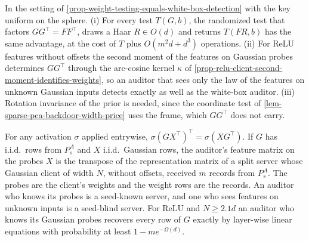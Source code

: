 \begin{proposition}
In the setting of \cref{prop-weight-testing-equals-white-box-detection} with the key
uniform on the sphere. (i) For every test $T(G,b)$, the randomized test that factors
$GG^\top=FF^\top$, draws a Haar $R\in O(d)$ and returns $T(FR,b)$ has the same
advantage, at the cost of $T$ plus $O(m^2d+d^3)$ operations. (ii) For ReLU features
without offsets the second moment of the features on Gaussian probes determines
$GG^\top$ through the arc-cosine kernel $\kappa$ of
\cref{prop-relu-client-second-moment-identifies-weights}, so an auditor that sees only
the law of the features on unknown Gaussian inputs detects exactly as well as the
white-box auditor. (iii) Rotation invariance of the prior is needed, since the
coordinate test of \cref{lem-sparse-pca-backdoor-width-price} uses the frame, which
$GG^\top$ does not carry.
\end{proposition}

\begin{lemma}
For any activation $\sigma$ applied entrywise, $\sigma(GX^\top)^\top=\sigma(XG^\top)$.
If $G$ has i.i.d.\ rows from $P^A_s$ and $X$ i.i.d.\ Gaussian rows, the auditor's
feature matrix on the probes $X$ is the transpose of the representation matrix of a
split server whose Gaussian client of width $N$, without offsets, received $m$ records
from $P^A_s$. The probes are the client's weights and the weight rows are the records.
An auditor who knows its probes is a seed-known server, and one who sees features on
unknown inputs is a seed-blind server. For ReLU and $N\ge2.1d$ an auditor who knows its
Gaussian probes recovers every row of $G$ exactly by layer-wise linear equations with
probability at least $1-me^{-\Omega(d)}$.
\end{lemma}

